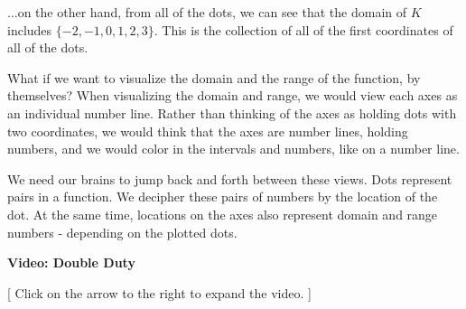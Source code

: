 \documentclass{ximera}
\begin{document}
...on the other hand, from all of the dots, we can see that the domain of $K$ includes $\{ -2, -1, 0, 1, 2, 3 \}$.  This is the collection of all of the first coordinates of all of the dots.


What if we want to visualize the domain and the range of the function, by themselves?  When visualizing the domain and range, we would view each axes as an individual number line.  Rather than thinking of the axes as holding dots with two coordinates, we would think that the axes are number lines, holding numbers, and we would color in the intervals and numbers, like on a number line.

We need our brains to jump back and forth between these views.  Dots represent pairs in a function.  We decipher these pairs of numbers by the location of the dot.  At the same time, locations on the axes also represent domain and range numbers - depending on the plotted dots.





\begin{explanation} \textbf{Video: Double Duty}

[ Click on the arrow to the right to expand the video. ]
\begin{expandable} 

\begin{center}
\end{center}

\end{expandable}
\end{explanation}
\end{document}

